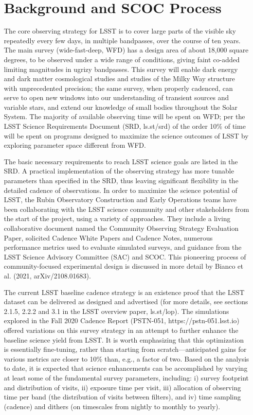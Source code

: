 \section{Background and SCOC Process}

The core observing strategy for LSST is to cover large parts of the visible sky repeatedly every few days, in multiple bandpasses, over the course of ten years. The main survey (wide-fast-deep, WFD) has a design area of about 18,000 square degrees, to be observed under a wide range of conditions, giving faint co-added limiting magnitudes in ugrizy bandpasses. This survey will enable dark energy and dark matter cosmological studies and studies of the Milky Way structure with unprecedented precision; the same survey, when properly cadenced, can serve to open new windows into our understanding of transient sources and variable stars, and extend our knowledge of small bodies throughout the Solar System. The majority of available observing time will be spent on WFD; per the LSST Science Requirements Document (SRD, ls.st/srd) of the order 10\% of time will be spent on programs designed to maximize the science outcomes of LSST by exploring parameter space different from WFD. 

The basic necessary requirements to reach LSST science goals are listed in the SRD. A practical implementation of the observing strategy has more tunable parameters than specified in the SRD, thus leaving significant flexibility in the detailed cadence of observations. In order to maximize the science potential of LSST, the Rubin Observatory Construction and Early Operations teams have been collaborating with the LSST science community and other stakeholders from the start of the project, using a variety of approaches. They include a living collaborative document named the Community Observing Strategy Evaluation Paper, solicited Cadence White Papers and Cadence Notes, numerous performance metrics used to evaluate simulated surveys, and guidance from the LSST Science Advisory Committee (SAC) and SCOC. This pioneering process of community-focused experimental design is discussed in more detail by Bianco et al. (2021, arXiv/2108.01683). 

The current LSST baseline cadence strategy is an existence proof that the LSST dataset can be delivered as designed and advertised (for more details, see sections 2.1.5, 2.2.2 and 3.1 in the LSST overview paper, ls.st/lop). The simulations explored in the Fall 2020 Cadence Report (PSTN-051, https://pstn-051.lsst.io) offered variations on this survey strategy in an attempt to further enhance the baseline science yield from LSST. It is worth emphasizing that this optimization is essentially fine-tuning, rather than starting from scratch—anticipated gains for various metrics are closer to 10\% than, e.g., a factor of two. Based on the analysis to date, it is expected that science enhancements can be accomplished by varying at least some of the fundamental survey parameters, including: i) survey footprint and distribution of visits,  ii) exposure time per visit, iii) allocation of observing time per band (the distribution of visits between filters), and iv) time sampling (cadence) and dithers (on timescales from nightly to monthly to yearly). 

